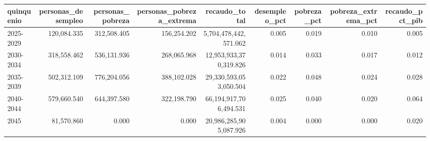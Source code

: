 \begin{tabular}{lrrrrrrrr}
\toprule
quinquenio & personas_desempleo & personas_pobreza & personas_pobreza_extrema & recaudo_total & desempleo_pct & pobreza_pct & pobreza_extrema_pct & recaudo_pct_pib \\
\midrule
2025-2029 & 120,084.335 & 312,508.405 & 156,254.202 & 5,704,478,442,571.062 & 0.005 & 0.019 & 0.010 & 0.005 \\
2030-2034 & 318,558.462 & 536,131.936 & 268,065.968 & 12,953,933,370,319.826 & 0.014 & 0.033 & 0.017 & 0.012 \\
2035-2039 & 502,312.109 & 776,204.056 & 388,102.028 & 29,330,593,053,050.504 & 0.022 & 0.048 & 0.024 & 0.028 \\
2040-2044 & 579,660.540 & 644,397.580 & 322,198.790 & 66,194,917,706,494.531 & 0.025 & 0.040 & 0.020 & 0.064 \\
2045 & 81,570.860 & 0.000 & 0.000 & 20,986,285,905,087.926 & 0.004 & 0.000 & 0.000 & 0.020 \\
\bottomrule
\end{tabular}
